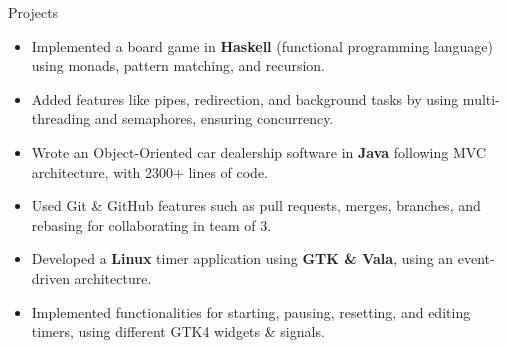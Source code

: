 \documentclass{resume} %
\begin{document}
\begin{workSection}{Projects}
	
	\customItem[
		title=\href{https://github.com/AshkanArabim/pwaang-extended}{PWAANG - a board game written in Haskell \faExternalLink},
		duration=May 2024,
	]
	\begin{itemize}
		\vspace{-0.5em}
		\itemsep -6pt {}
		\item Implemented a board game in \textbf{Haskell} (functional programming language) using monads, pattern matching, and recursion.
	\end{itemize}
	
	\customItem[
		title=\href{https://github.com/AshkanArabim/bombshell}{Bombshell - UNIX shell written in Python \faExternalLink},
		duration=April 2024,
	]
	\begin{itemize}
		\vspace{-0.5em}
		\itemsep -6pt {}
		\item Added features like pipes, redirection, and background tasks by using multi-threading and semaphores, ensuring concurrency.
	\end{itemize}
	
	\customItem[
		title=CLI Car Dealership,
		duration=April 2024,
	]
	\begin{itemize}
		\vspace{-0.5em}
		\itemsep -6pt {}
		\item Wrote an Object-Oriented car dealership software in \textbf{Java} following MVC architecture, with 2300+ lines of code.
		\item Used Git \& GitHub features such as pull requests, merges, branches, and rebasing for collaborating in team of 3.
	\end{itemize}
	
	\customItem[
		title=\href{https://github.com/AshkanArabim/gtk-timer}{Linux Timer \faExternalLink},
		duration=January 2024,
	]
	\begin{itemize}
		\vspace{-0.5em}
		\itemsep -6pt {}
		\item Developed a \textbf{Linux} timer application using \textbf{GTK \& Vala}, using an event-driven architecture.
		\item Implemented functionalities for starting, pausing, resetting, and editing timers, using different GTK4 widgets \& signals.
	\end{itemize}
	

\end{workSection}
\end{document}
